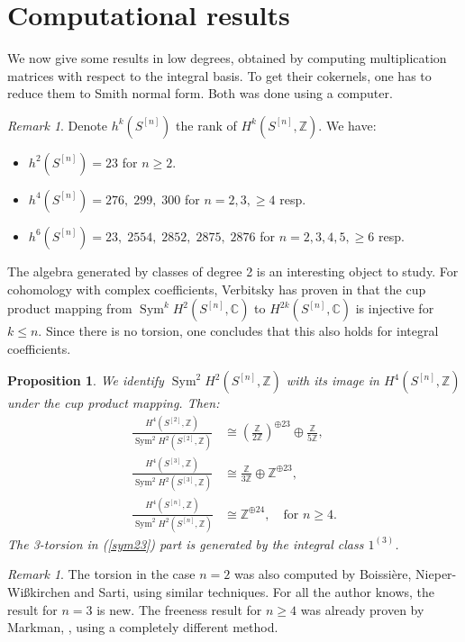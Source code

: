\documentclass{amsart}
\DeclareMathOperator{\Sym}{Sym}
\newcommand{\hilb}[1]{^{[#1]}}
\newcommand{\IC}{\mathbb{C}}
\newcommand{\IZ}{\mathbb{Z}}
\theoremstyle{plain}
\newtheorem{proposition}[theorem]{Proposition}
\theoremstyle{definition}
\theoremstyle{remark}
\newtheorem{remark}[theorem]{Remark}
\begin{document}
\section{Computational results} \label{CompSection}
We now give some results in low degrees, obtained by computing multiplication matrices with respect to the integral basis. To get their cokernels, one has to reduce them to Smith normal form. Both was done using a computer.
\begin{remark}
Denote $h^k(S\hilb{n})$ the rank of $H^k(S\hilb{n},\IZ)$. We have:
\begin{itemize}
\item $h^2(S\hilb{n}) = 23 $ for $n\geq 2$.
\item $h^4(S\hilb{n}) = 276,\; 299,\; 300$ for $n=2,3, \geq 4$ resp.
\item $h^6(S\hilb{n}) = 23,\; 2554,\; 2852,\; 2875,\; 2876$ for $n=2,3,4,5,\geq6$ resp.
\end{itemize}
\end{remark}
The algebra generated by classes of degree 2 is an interesting object to study. For cohomology with complex coefficients, Verbitsky has proven in \cite{Verbitsky} that the cup product mapping from $\Sym^k H^2(S\hilb{n},\IC)$ to $H^{2k}(S\hilb{n},\IC)$ is injective for $k\leq n$. Since there is no torsion, one concludes that this also holds for integral coefficients.
\begin{proposition} We identify $\Sym^2H^2(S\hilb{n},\IZ)$ with its image in $H^4(S\hilb{n},\IZ)$ under the cup product mapping. Then: 
\begin{align}
\frac{H^4(S\hilb{2},\IZ)}{\Sym^2 H^2(S\hilb{2},\IZ)} & \cong \left(\frac{\IZ}{2\IZ}\right)^{\oplus 23} \oplus \frac{\IZ}{5\IZ},\\
\label{sym23}
\frac{H^4(S\hilb{3},\IZ)}{\Sym^2 H^2(S\hilb{3},\IZ)} & \cong \frac{\IZ}{3\IZ} \oplus \IZ^ {\oplus 23}, \\
\frac{H^4(S\hilb{n},\IZ)}{\Sym^2 H^2(S\hilb{n},\IZ)} & \cong  \IZ^ {\oplus 24}, \quad \text{for }n\geq 4.
\end{align}
The 3-torsion in (\ref{sym23}) part is generated by the integral class $1^{(3)}$.
\end{proposition}
\begin{remark}
The torsion in the case $n=2$ was also computed by Boissi\`{e}re, Nieper-Wi\ss kirchen and Sarti, \cite[Prop. 3]{BNS} using similar techniques.
For all the author knows, the result for $n=3$ is new.
The freeness result for $n\geq 4$ was already proven by Markman, \cite[Thm. 1.10]{Markman2}, using a completely different method. 
\end{remark}
\end{document}
